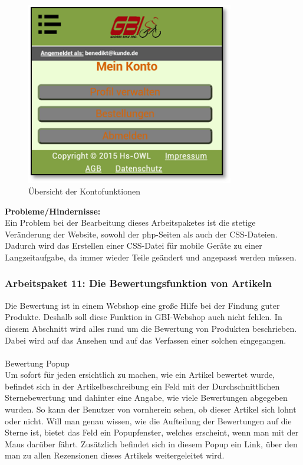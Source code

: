 \begin{figure}[H]
\begin{center}
\includegraphics[height=8cm]{Bilder/Michael_Abbildung9-UebersichtDerKontofunktionen.png}
\end{center}
\caption{Übersicht der Kontofunktionen}
\end{figure}

\newpage
\textbf{Probleme/Hindernisse:}
\\
Ein Problem bei der Bearbeitung dieses Arbeitspaketes ist die stetige Veränderung der Website, sowohl der php-Seiten als auch der CSS-Dateien. Dadurch wird das Erstellen einer CSS-Datei für mobile Geräte zu einer Langzeitaufgabe, da immer wieder Teile geändert und angepasst werden müssen. 


\subsubsection{Arbeitspaket 11: Die Bewertungsfunktion von Artikeln}

Die Bewertung ist in einem Webshop eine große Hilfe bei der Findung guter Produkte. Deshalb soll diese Funktion in GBI-Webshop auch nicht fehlen. 
In diesem Abschnitt wird alles rund um die Bewertung von Produkten beschrieben. Dabei wird auf das Ansehen und auf das Verfassen einer solchen eingegangen.
\\ \\
Bewertung Popup
\\
Um sofort für jeden ersichtlich zu machen, wie ein Artikel bewertet wurde, befindet sich in der Artikelbeschreibung ein Feld mit der Durchschnittlichen Sternebewertung und dahinter eine Angabe, wie viele Bewertungen abgegeben wurden. So kann der Benutzer von vornherein sehen, ob dieser Artikel sich lohnt oder nicht. Will man genau wissen, wie die Aufteilung der Bewertungen auf die Sterne ist, bietet das Feld ein Popupfenster, welches erscheint, wenn man mit der Maus darüber fährt. Zusätzlich befindet sich in diesem Popup ein Link, über den man zu allen Rezensionen dieses Artikels weitergeleitet wird.


